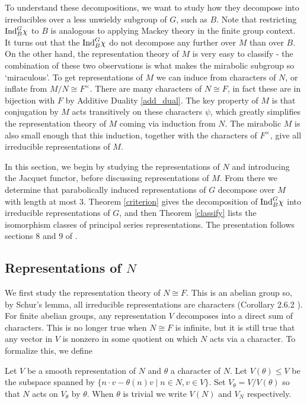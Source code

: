 To understand these decompositions, we want to study how they decompose into irreducibles over a less unwieldy subgroup of $G$, such as $B$. Note that restricting $\mathrm{Ind}_B^G \chi$ to $B$ is analogous to applying Mackey theory in the finite group context. It turns out that the $\mathrm{Ind}_B^G \chi$ do not decompose any further over $M$ than over $B$. On the other hand, the representation theory of $M$ is very easy to classify - the combination of these two observations is what makes the mirabolic subgroup so `miraculous'. To get representations of $M$ we can induce from characters of $N$, or inflate from $M/N\cong F^\times$. There are many characters of $N\cong F$, in fact these are in bijection with $F$ by Additive Duality \ref{add_dual}. The key property of $M$ is that conjugation by $M$ acts transitively on these characters $\psi$, which greatly simplifies the representation theory of $M$ coming via induction from $N$. The mirabolic $M$ is also small enough that this induction, together with the characters of $F^\times$, give all irreducible representations of $M$.

In this section, we begin by studying the representations of $N$ and introducing the Jacquet functor, before discussing representations of $M$. From there we determine that parabolically induced representations of $G$ decompose over $M$ with length at most 3. Theorem \ref{criterion} gives the decomposition of $\mathrm{Ind}_B^G \chi$ into irreducible representations of $G$, and then Theorem \ref{classify} lists the isomorphism classes of principal series representations. The presentation follows sections 8 and 9 of \cite{BH1}.

\subsection{Representations of \texorpdfstring{$N$}{TEXT}}

We first study the representation theory of $N \cong F$. This is an abelian group so, by Schur's lemma, all irreducible representations are characters (Corollary 2.6.2 \cite{BH1}). For finite abelian groups, any representation $V$ decomposes into a direct sum of characters. This is no longer true when $N\cong F$ is infinite, but it is still true that any vector in $V$ is nonzero in some quotient on which $N$ acts via a character. To formalize this, we define

\begin{notn}
    Let $V$ be a smooth representation of $N$ and $\theta$ a character of $N$. Let $V(\theta) \leq V$ be the subspace spanned by $\{n\cdot v - \theta(n)v \mid n \in N, v \in V\}$. Set $V_\theta = V/V(\theta)$ so that $N$ acts on $V_\theta$ by $\theta$. When $\theta$ is trivial we write $V(N)$ and $V_N$ respectively. 
\end{notn}

